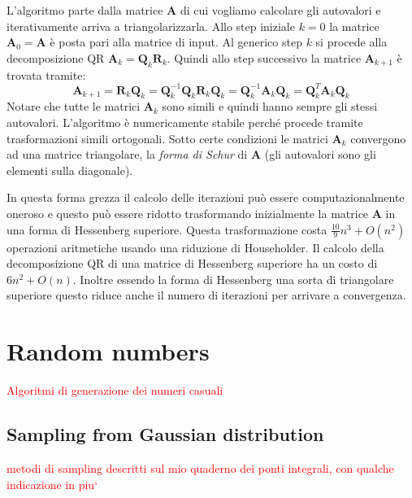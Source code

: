 \documentclass[10pt]{article}
\begin{document}
L'algoritmo parte dalla matrice $\mathbf{A}$ di cui vogliamo calcolare gli autovalori e iterativamente arriva a triangolarizzarla. Allo step iniziale $k=0$ la matrice $\mathbf{A}_0=\mathbf{A}$ è posta pari alla matrice di input. Al generico step $k$ si procede alla decomposizione QR $\mathbf{A}_k=\mathbf{Q}_k\mathbf{R}_k$. Quindi allo step successivo la matrice $\mathbf{A}_{k+1}$ è trovata tramite:
\begin{equation}
\mathbf{A}_{k+1} = \mathbf{R}_k\mathbf{Q}_k = \mathbf{Q}_k^{-1}\mathbf{Q}_k\mathbf{R}_k\mathbf{Q}_k = 
\mathbf{Q}_k^{-1}\mathbf{A}_k\mathbf{Q}_k = \mathbf{Q}_k^T\mathbf{A}_k\mathbf{Q}_k
\end{equation}
Notare che tutte le matrici $\mathbf{A}_k$ sono simili e quindi hanno sempre gli stessi autovalori. L'algoritmo è numericamente stabile perché procede tramite trasformazioni simili ortogonali.
Sotto certe condizioni le matrici $\mathbf{A}_k$ convergono ad una matrice triangolare, la \emph{forma di Schur} di $\mathbf{A}$ (gli autovalori sono gli elementi sulla diagonale).

In questa forma grezza il calcolo delle iterazioni può essere computazionalmente oneroso e questo può essere ridotto trasformando inizialmente la matrice $\mathbf{A}$ in una forma di Hessenberg superiore. Questa trasformazione costa $\frac{10}{9}n^3+O(n^2)$ operazioni aritmetiche usando una riduzione di Householder. Il calcolo della decomposizione QR di una matrice di Hessenberg superiore ha un costo di $6n^2+O(n)$. Inoltre essendo la forma di Hessenberg una sorta di triangolare superiore questo riduce anche il numero di iterazioni per arrivare a convergenza.





\newpage

\appendix

\section{Random numbers}

\textcolor{red}{Algoritmi di generazione dei numeri casuali}

\subsection{Sampling from Gaussian distribution}

\textcolor{red}{metodi di sampling descritti sul mio quaderno dei ponti integrali, con qualche indicazione in piu`}
\end{document}
